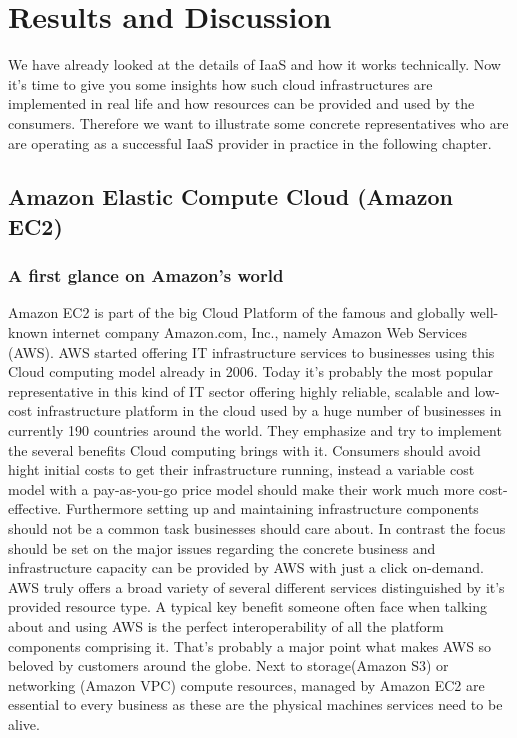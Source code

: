 \chapter{Results and Discussion}
\label{chap:evaluation}
We have already looked at the details of IaaS and how it works technically.
Now it's time to give you some insights how such cloud infrastructures are implemented in real life and how resources can be provided and used by the consumers. Therefore we want to illustrate some concrete representatives who are are operating as a successful IaaS provider in practice in the following chapter.

\section{Amazon Elastic Compute Cloud (Amazon EC2)}

\subsection{A first glance on Amazon's world}
Amazon EC2 is part of the big Cloud Platform of the famous and globally well-known internet company Amazon.com, Inc., namely Amazon Web Services (AWS). AWS started offering IT infrastructure services to businesses using this Cloud computing model already in 2006. Today it's probably the most popular representative in this kind of IT sector offering highly reliable, scalable and low-cost infrastructure platform in the cloud used by a huge number of businesses in currently 190 countries around the world. They emphasize and try to implement the several benefits Cloud computing brings with it. Consumers should avoid hight initial costs to get their infrastructure running, instead a variable cost model with a pay-as-you-go price model should make their work much more cost-effective. Furthermore setting up and maintaining infrastructure components should not be a common task businesses should care about. In contrast the focus should be set on the major issues regarding the concrete business and infrastructure capacity can be provided by AWS with just a click on-demand. AWS truly offers a broad variety of several different services distinguished by it's provided resource type. A typical key benefit someone often face when talking about and using AWS is the perfect interoperability of all the platform components comprising it. That's probably a major point what makes AWS so beloved by customers around the globe. Next to storage(Amazon S3) or networking (Amazon VPC) compute resources, managed by Amazon EC2 are essential to every business as these are the physical machines services need to be alive. \cite{AWS_Overview}

